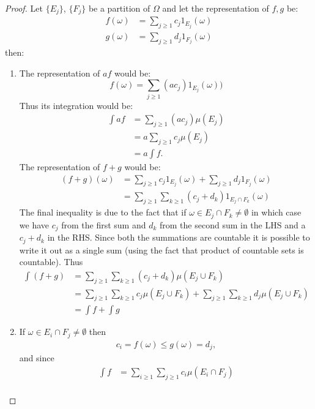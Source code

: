\begin{proof}
Let $\{E_j\}$, $\{F_j\}$ be a partition of $\Omega$ and let the representation of $f,g$ be:
\begin{align*}
  f(\omega) &= \sum_{j\geq 1} c_j 1_{E_j}(\omega)\\
  g(\omega) &= \sum_{j\geq 1} d_j 1_{F_j}(\omega)
\end{align*}
then:
\begin{enumerate}
  \item The representation of $af$ would be:
    \[f(\omega) = \sum_{j\geq 1} (a c_j) 1_{E_j}(\omega))\]
    Thus its integration would be:
    \begin{align*}
      \int af &= \sum_{j\geq 1} (ac_j) \mu(E_j)\\
       &= a\sum_{j\geq 1} c_j \mu(E_j)\\
       &= a\int f.
    \end{align*}
    The representation of $f+g$ would be:
    \begin{align*}
      (f+g)(\omega) &= \sum_{j\geq 1} c_j 1_{E_j}(\omega) + \sum_{j\geq 1} d_j 1_{F_j}(\omega)\\
                    &= \sum_{j\geq 1} \sum_{k\geq 1} (c_j+d_k)1_{E_j\cap F_k}(\omega)
    \end{align*}
    The final inequality is due to the fact that if $\omega \in E_j\cap F_k \neq \emptyset$ in which case we have $c_j$ from the first sum and $d_k$ from the second sum in the LHS and a $c_j+d_k$ in the RHS. Since both the summations are countable it is possible to write it out as a single sum (using the fact that product of countable sets is countable). Thus
    \begin{align*}
      \int (f+g) &= \sum_{j\geq 1}\sum_{k\geq 1} (c_j+d_k) \mu(E_j \cup F_k)\\
       &= \sum_{j\geq 1}\sum_{k\geq 1} c_j \mu(E_j \cup F_k) + \sum_{j\geq 1}\sum_{k\geq 1} d_j \mu(E_j \cup F_k)\\
       &= \int f + \int g
    \end{align*}
  \item If $\omega \in E_i\cap F_j \neq \emptyset$ then
    \begin{align*}
      c_i = f(\omega) \leq g(\omega) = d_j,
    \end{align*}
    and since
    \begin{align*}
      \int f &= \sum_{i\geq1} \sum_{j\geq 1} c_i \mu(E_i\cap F_j)\\
    \end{align*}

\end{enumerate}
\end{proof}

